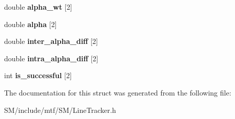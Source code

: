 \begin{DoxyCompactItemize}
\item 
\hypertarget{structgridPoint_a1a8711bc3b647754f0c07d7a38aad9a4}{double {\bfseries alpha\-\_\-wt} \mbox{[}2\mbox{]}}\label{structgridPoint_a1a8711bc3b647754f0c07d7a38aad9a4}

\item 
\hypertarget{structgridPoint_a15099a748c9e299a5206237438f3afb0}{double {\bfseries alpha} \mbox{[}2\mbox{]}}\label{structgridPoint_a15099a748c9e299a5206237438f3afb0}

\item 
\hypertarget{structgridPoint_ab4171ae238da2b2e2da3ae438d3fa9b0}{double {\bfseries inter\-\_\-alpha\-\_\-diff} \mbox{[}2\mbox{]}}\label{structgridPoint_ab4171ae238da2b2e2da3ae438d3fa9b0}

\item 
\hypertarget{structgridPoint_a3cc0b1d4b18ba862234505b4faa15f89}{double {\bfseries intra\-\_\-alpha\-\_\-diff} \mbox{[}2\mbox{]}}\label{structgridPoint_a3cc0b1d4b18ba862234505b4faa15f89}

\item 
\hypertarget{structgridPoint_a381f34e631d893523fae406133e95701}{int {\bfseries is\-\_\-successful} \mbox{[}2\mbox{]}}\label{structgridPoint_a381f34e631d893523fae406133e95701}

\end{DoxyCompactItemize}


The documentation for this struct was generated from the following file\-:\begin{DoxyCompactItemize}
\item 
S\-M/include/mtf/\-S\-M/Line\-Tracker.\-h\end{DoxyCompactItemize}
